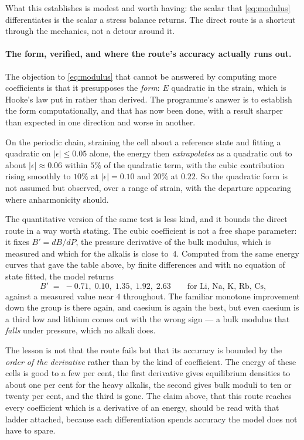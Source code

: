 \documentclass[11pt]{article}
\begin{document}
What this establishes is modest and worth having: the scalar that \eqref{eq:modulus} differentiates
is the scalar a stress balance returns. The direct route is a shortcut through the mechanics, not a
detour around it.

\paragraph{The form, verified, and where the route's accuracy actually runs out.}\label{sec:form} The objection
to \eqref{eq:modulus} that cannot be answered by computing more coefficients is that it presupposes
the \emph{form}: $E$ quadratic in the strain, which is Hooke's law put in rather than derived. The
programme's answer is to establish the form computationally, and that has now been done, with a
result sharper than expected in one direction and worse in another.

On the periodic chain, straining the cell about a reference state and fitting a quadratic on
$|\epsilon|\le0.05$ alone, the energy then \emph{extrapolates} as a quadratic out to about
$|\epsilon|\approx0.06$ within $5\%$ of the quadratic term, with the cubic contribution rising
smoothly to $10\%$ at $|\epsilon|=0.10$ and $20\%$ at $0.22$. So the quadratic form is not assumed
but observed, over a range of strain, with the departure appearing where anharmonicity should.

The quantitative version of the same test is less kind, and it bounds the direct route in a way
worth stating. The cubic coefficient is not a free shape parameter: it fixes $B'=dB/dP$, the
pressure derivative of the bulk modulus, which is measured and which for the alkalis is close
to~$4$. Computed from the same energy curves that gave the table above, by finite differences and
with no equation of state fitted, the model returns
\[
B' \;=\; -0.71,\; 0.10,\; 1.35,\; 1.92,\; 2.63 \qquad\text{for Li, Na, K, Rb, Cs,}
\]
against a measured value near $4$ throughout. The familiar monotone improvement down the group is
there again, and caesium is again the best, but even caesium is a third low and lithium comes out
with the wrong sign --- a bulk modulus that \emph{falls} under pressure, which no alkali does.

The lesson is not that the route fails but that its accuracy is bounded by the \emph{order of the
derivative} rather than by the kind of coefficient. The energy of these cells is good to a few per
cent, the first derivative gives equilibrium densities to about one per cent for the heavy alkalis,
the second gives bulk moduli to ten or twenty per cent, and the third is gone. The claim above, that this route reaches
every coefficient which is a derivative of an energy, should be read with that ladder attached, because each differentiation spends accuracy the model does not have to spare.
\end{document}
